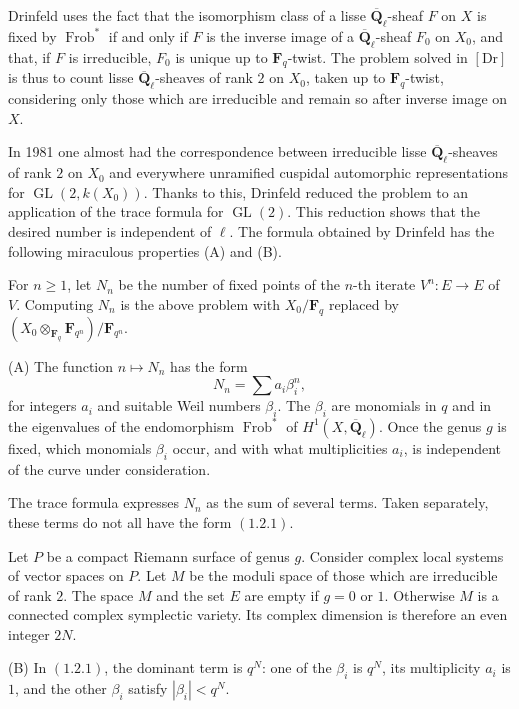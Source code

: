 \documentclass[11pt]{article}
\newcommand{\Qbar}{\overline{\mathbf Q}}
\newcommand{\Fq}{\mathbf F_q}
\newcommand{\Frob}{\operatorname{Frob}}
\newcommand{\GL}{\operatorname{GL}}
\begin{document}
Drinfeld uses the fact that the isomorphism class of a lisse \(\Qbar_\ell\)-sheaf \(F\) on \(X\) is fixed by \(\Frob^*\) if and only if \(F\) is the inverse image of a \(\Qbar_\ell\)-sheaf \(F_0\) on \(X_0\), and that, if \(F\) is irreducible, \(F_0\) is unique up to \(\Fq\)-twist. The problem solved in \([\mathrm{Dr}]\) is thus to count lisse \(\Qbar_\ell\)-sheaves of rank \(2\) on \(X_0\), taken up to \(\Fq\)-twist, considering only those which are irreducible and remain so after inverse image on \(X\).

In 1981 one almost had the correspondence between irreducible lisse \(\Qbar_\ell\)-sheaves of rank \(2\) on \(X_0\) and everywhere unramified cuspidal automorphic representations for \(\GL(2,k(X_0))\). Thanks to this, Drinfeld reduced the problem to an application of the trace formula for \(\GL(2)\). This reduction shows that the desired number is independent of \(\ell\). The formula obtained by Drinfeld has the following miraculous properties (A) and (B).

For \(n\ge 1\), let \(N_n\) be the number of fixed points of the \(n\)-th iterate \(V^n:E\to E\) of \(V\). Computing \(N_n\) is the above problem with \(X_0/\Fq\) replaced by \((X_0\otimes_{\Fq}\mathbf F_{q^n})/\mathbf F_{q^n}\).

(A) The function \(n\mapsto N_n\) has the form
\begin{equation}\tag{1.2.1}
N_n=\sum a_i\beta_i^n,
\end{equation}
for integers \(a_i\) and suitable Weil numbers \(\beta_i\). The \(\beta_i\) are monomials in \(q\) and in the eigenvalues of the endomorphism \(\Frob^*\) of \(H^1(X,\Qbar_\ell)\). Once the genus \(g\) is fixed, which monomials \(\beta_i\) occur, and with what multiplicities \(a_i\), is independent of the curve under consideration.

The trace formula expresses \(N_n\) as the sum of several terms. Taken separately, these terms do not all have the form \((1.2.1)\).

Let \(P\) be a compact Riemann surface of genus \(g\). Consider complex local systems of vector spaces on \(P\). Let \(M\) be the moduli space of those which are irreducible of rank \(2\). The space \(M\) and the set \(E\) are empty if \(g=0\) or \(1\). Otherwise \(M\) is a connected complex symplectic variety. Its complex dimension is therefore an even integer \(2N\).

(B) In \((1.2.1)\), the dominant term is \(q^N\): one of the \(\beta_i\) is \(q^N\), its multiplicity \(a_i\) is \(1\), and the other \(\beta_i\) satisfy \(|\beta_i|<q^N\).
\end{document}
